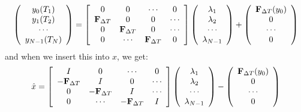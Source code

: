 \begin{align}
\left( \begin{array}{c}
   y_0(T_1) \\  
   y_1(T_2) \\ 
   \cdots  \\
   y_{N-1}(T_N)  \\
   \end{array}  \right)= 
   \left[ \begin{array}{cccc}  
   0 & 0 & \cdots & 0 \\ 
   \bold{F}_{\Delta T}&0 & 0  & \cdots \\
   0 &  \bold{F}_{\Delta T}&0 & \cdots \\
   0 &\cdots &\bold{F}_{\Delta T}& 0   \\
   \end{array}  \right]
   \left( \begin{array}{c}
   \lambda_1 \\  
   \lambda_2 \\ 
   \cdots  \\
   \lambda_{N-1}  \\
   \end{array}  \right) + 
   \left( \begin{array}{c}
   \bold{F}_{\Delta T}(y_0)\\  
   0\\ 
   \cdots  \\
   0  \\
   \end{array}  \right)
\end{align}
and when we insert this into $x$, we get:
\begin{align}
\hat{x} = \left[ \begin{array}{cccc}
   I & 0 & \cdots & 0 \\  
   -\bold{F}_{\Delta T} & I & 0 & \cdots \\ 
   0 &-\bold{F}_{\Delta T} & I  & \cdots \\
   0 &\cdots &-\bold{F}_{\Delta T} & I   \\
   \end{array}  \right]
   \left( \begin{array}{c}
   \lambda_1 \\  
   \lambda_2 \\ 
   \cdots  \\
   \lambda_{N-1}  \\
   \end{array}  \right) -
   \left( \begin{array}{c}
   \bold{F}_{\Delta T}(y_0)\\  
   0\\ 
   \cdots  \\
   0  \\
   \end{array}  \right)
\end{align}
